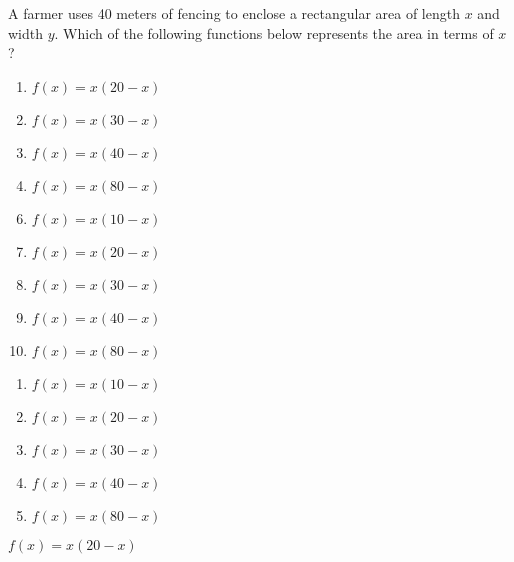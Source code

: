 










 A farmer uses 40 meters of fencing to enclose a rectangular area of length $x$ and width $y$.  Which of the following functions below represents the area in terms of $x$?


\ifsat
	\begin{enumerate}[label=\Alph*)]
		\item  $f(x)=x(20-x)$%
		\item  $f(x)=x(30-x)$
		\item  $f(x)=x(40-x)$
		\item  $f(x)=x(80-x)$
	\end{enumerate}
\else
\fi

\ifacteven
	\begin{enumerate}[label=\textbf{\Alph*.},itemsep=\fill,align=left]
		\setcounter{enumii}{5}
		\item   $f(x)=x(10-x)$ 
		\item  $f(x)=x(20-x)$%
		\item  $f(x)=x(30-x)$
		\addtocounter{enumii}{1}
		\item  $f(x)=x(40-x)$
		\item  $f(x)=x(80-x)$
	\end{enumerate}
\else
\fi

\ifactodd
	\begin{enumerate}[label=\textbf{\Alph*.},itemsep=\fill,align=left]
		\item   $f(x)=x(10-x)$ 
		\item  $f(x)=x(20-x)$%
		\item  $f(x)=x(30-x)$
		\item  $f(x)=x(40-x)$
		\item  $f(x)=x(80-x)$
	\end{enumerate}
\else
\fi

\ifgridin
  $f(x)=x(20-x)$%
		
\else
\fi

